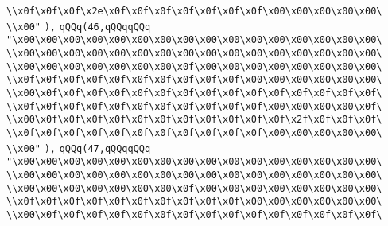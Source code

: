 \verb|\\x0f\x0f\x0f\x2e\x0f\x0f\x0f\x0f\x0f\x0f\x0f\x00\x00\x00\x00\x00\|\newline
\verb|\\x00"|\newline
\verb|),|\newline
\verb|qQQq(46,qQQqqQQq|\newline
\verb|"\x00\x00\x00\x00\x00\x00\x00\x00\x00\x00\x00\x00\x00\x00\x00\x00\|\newline
\verb|\\x00\x00\x00\x00\x00\x00\x00\x00\x00\x00\x00\x00\x00\x00\x00\x00\|\newline
\verb|\\x00\x00\x00\x00\x00\x00\x00\x0f\x00\x00\x00\x00\x00\x00\x00\x00\|\newline
\verb|\\x0f\x0f\x0f\x0f\x0f\x0f\x0f\x0f\x0f\x0f\x00\x00\x00\x00\x00\x00\|\newline
\verb|\\x00\x0f\x0f\x0f\x0f\x0f\x0f\x0f\x0f\x0f\x0f\x0f\x0f\x0f\x0f\x0f\|\newline
\verb|\\x0f\x0f\x0f\x0f\x0f\x0f\x0f\x0f\x0f\x0f\x0f\x00\x00\x00\x00\x0f\|\newline
\verb|\\x00\x0f\x0f\x0f\x0f\x0f\x0f\x0f\x0f\x0f\x0f\x0f\x2f\x0f\x0f\x0f\|\newline
\verb|\\x0f\x0f\x0f\x0f\x0f\x0f\x0f\x0f\x0f\x0f\x0f\x00\x00\x00\x00\x00\|\newline
\verb|\\x00"|\newline
\verb|),|\newline
\verb|qQQq(47,qQQqqQQq|\newline
\verb|"\x00\x00\x00\x00\x00\x00\x00\x00\x00\x00\x00\x00\x00\x00\x00\x00\|\newline
\verb|\\x00\x00\x00\x00\x00\x00\x00\x00\x00\x00\x00\x00\x00\x00\x00\x00\|\newline
\verb|\\x00\x00\x00\x00\x00\x00\x00\x0f\x00\x00\x00\x00\x00\x00\x00\x00\|\newline
\verb|\\x0f\x0f\x0f\x0f\x0f\x0f\x0f\x0f\x0f\x0f\x00\x00\x00\x00\x00\x00\|\newline
\verb|\\x00\x0f\x0f\x0f\x0f\x0f\x0f\x0f\x0f\x0f\x0f\x0f\x0f\x0f\x0f\x0f\|\newline
